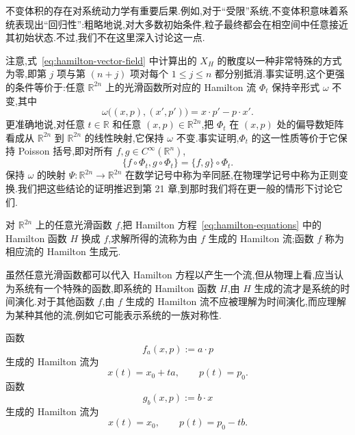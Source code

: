 不变体积的存在对系统动力学有重要后果.例如,对于“受限”系统,不变体积意味着系统表现出“回归性”:粗略地说,对大多数初始条件,粒子最终都会在相空间中任意接近其初始状态.不过,我们不在这里深入讨论这一点.

注意,式~\eqref{eq:hamilton-vector-field} 中计算出的 $X_{H}$ 的散度以一种非常特殊的方式为零,即第 $j$ 项与第 $(n+j)$ 项对每个 $1\leq j\leq n$ 都分别抵消.事实证明,这个更强的条件等价于:任意 $\mathbb{R}^{2n}$ 上的光滑函数所对应的 Hamilton 流 $\Phi_{t}$ 保持辛形式 $\omega$ 不变,其中
\[
  \omega\bigl((x,p),(x',p')\bigr)=x\cdot p'-p\cdot x'.
\]
更准确地说,对任意 $t\in\mathbb{R}$ 和任意 $(x,p)\in\mathbb{R}^{2n}$,把 $\Phi_{t}$ 在 $(x,p)$ 处的偏导数矩阵看成从 $\mathbb{R}^{2n}$ 到 $\mathbb{R}^{2n}$ 的线性映射,它保持 $\omega$ 不变.事实证明,$\Phi_{t}$ 的这一性质等价于它保持 Poisson 括号,即对所有 $f,g\in C^{\infty}(\mathbb{R}^{n})$,
\[
  \{f\circ\Phi_{t},g\circ\Phi_{t}\}=\{f,g\}\circ\Phi_{t}.
\]
保持 $\omega$ 的映射 $\Psi:\mathbb{R}^{2n}\to\mathbb{R}^{2n}$ 在数学记号中称为辛同胚,在物理学记号中称为正则变换.我们把这些结论的证明推迟到第 21 章,到那时我们将在更一般的情形下讨论它们.

\begin{definition}\label{def:hamiltonian-generator}
对 $\mathbb{R}^{2n}$ 上的任意光滑函数 $f$,把 Hamilton 方程~\eqref{eq:hamilton-equations} 中的 Hamilton 函数 $H$ 换成 $f$,求解所得的流称为由 $f$ 生成的 Hamilton 流;函数 $f$ 称为相应流的 Hamilton 生成元.
\end{definition}

虽然任意光滑函数都可以代入 Hamilton 方程以产生一个流,但从物理上看,应当认为系统有一个特殊的函数,即系统的 Hamilton 函数 $H$,由 $H$ 生成的流才是系统的时间演化.对于其他函数 $f$,由 $f$ 生成的 Hamilton 流不应被理解为时间演化,而应理解为某种其他的流,例如它可能表示系统的一族对称性.

\begin{proposition}\label{pro:hamiltonian-translations}
函数
\begin{equation}
  f_{a}(x,p):=a\cdot p
  \label{eq:hamiltonian-position-translation}
\end{equation}
生成的 Hamilton 流为
\begin{equation}
  x(t)=x_{0}+ta,\qquad p(t)=p_{0}.
  \label{eq:hamiltonian-position-translation-flow}
\end{equation}
函数
\begin{equation}
  g_{b}(x,p):=b\cdot x
  \label{eq:hamiltonian-momentum-translation}
\end{equation}
生成的 Hamilton 流为
\[
  x(t)=x_{0},\qquad p(t)=p_{0}-tb.
\]
\end{proposition}

